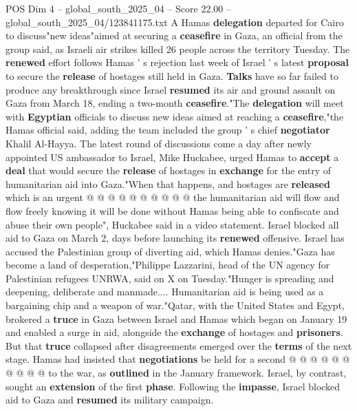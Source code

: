 \begin{textsample}{POS Dim 4 – global\_south\_2025\_04 – Score 22.00 – global\_south\_2025\_04/123841175.txt}  \label{ex:f4_pos_224}
A Hamas \textbf{delegation} departed for Cairo to discuss"new ideas"aimed at securing a \textbf{ceasefire} in Gaza, an official from the group said, as Israeli air strikes killed 26 people across the territory Tuesday.
The \textbf{renewed} effort follows Hamas ' s rejection last week of Israel ' s latest \textbf{proposal} to secure the \textbf{release} of hostages still held in Gaza. \textbf{Talks} have so far failed to produce any breakthrough since Israel \textbf{resumed} its air and ground assault on Gaza from March 18, ending a two-month \textbf{ceasefire}."The \textbf{delegation} will meet with \textbf{Egyptian} officials to discuss new ideas aimed at reaching a \textbf{ceasefire},"the Hamas official said, adding the team included the group ' s chief \textbf{negotiator} Khalil Al-Hayya.
The latest round of discussions come a day after newly appointed US ambassador to Israel, Mike Huckabee, urged Hamas to \textbf{accept} a \textbf{deal} that would secure the \textbf{release} of hostages in \textbf{exchange} for the entry of humanitarian aid into Gaza."When that happens, and hostages are \textbf{released} which is an urgent @ @ @ @ @ @ @ @ @ @ the humanitarian aid will flow and flow freely knowing it will be done without Hamas being able to confiscate and abuse their own people", Huckabee said in a video statement.
Israel blocked all aid to Gaza on March 2, days before launching its \textbf{renewed} offensive.
Israel has accused the Palestinian group of diverting aid, which Hamas denies."Gaza has become a land of desperation,"Philippe Lazzarini, head of the UN agency for Palestinian refugees UNRWA, said on X on Tuesday."Hunger is spreading and deepening, deliberate and manmade....
Humanitarian aid is being used as a bargaining chip and a weapon of war."Qatar, with the United States and Egypt, brokered a \textbf{truce} in Gaza between Israel and Hamas which began on January 19 and enabled a surge in aid, alongside the \textbf{exchange} of hostages and \textbf{prisoners}.
But that \textbf{truce} collapsed after disagreements emerged over the \textbf{terms} of the next stage.
Hamas had insisted that \textbf{negotiations} be held for a second @ @ @ @ @ @ @ @ @ @ to the war, as \textbf{outlined} in the January framework.
Israel, by contrast, sought an \textbf{extension} of the first \textbf{phase}.
Following the \textbf{impasse}, Israel blocked aid to Gaza and \textbf{resumed} its military campaign.

\end{textsample}
